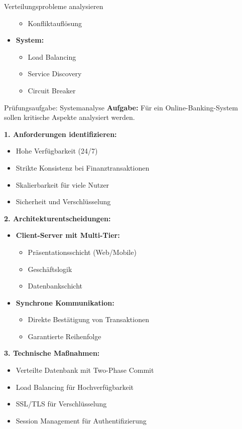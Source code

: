 \begin{KR}{Verteilungsprobleme analysieren}
\begin{minipage}[t]{0.5\textwidth}
\begin{itemize}
\begin{itemize}
                \item Konfliktauflösung
            \end{itemize}
            \item \textbf{System:}
            \begin{itemize}
                \item Load Balancing
                \item Service Discovery
                \item Circuit Breaker
            \end{itemize}
        \end{itemize}
    \end{minipage}
\end{KR}



\begin{example2}{Prüfungsaufgabe: Systemanalyse}
\textbf{Aufgabe:}
Für ein Online-Banking-System sollen kritische Aspekte analysiert werden.

\textbf{1. Anforderungen identifizieren:}
\begin{itemize}
    \item Hohe Verfügbarkeit (24/7)
    \item Strikte Konsistenz bei Finanztransaktionen
    \item Skalierbarkeit für viele Nutzer
    \item Sicherheit und Verschlüsselung
\end{itemize}

\textbf{2. Architekturentscheidungen:}
\begin{itemize}
    \item \textbf{Client-Server mit Multi-Tier:}
    \begin{itemize}
        \item Präsentationsschicht (Web/Mobile)
        \item Geschäftslogik
        \item Datenbankschicht
    \end{itemize}
    
    \item \textbf{Synchrone Kommunikation:}
    \begin{itemize}
        \item Direkte Bestätigung von Transaktionen
        \item Garantierte Reihenfolge
    \end{itemize}
\end{itemize}

\textbf{3. Technische Maßnahmen:}
\begin{itemize}
    \item Verteilte Datenbank mit Two-Phase Commit
    \item Load Balancing für Hochverfügbarkeit
    \item SSL/TLS für Verschlüsselung
    \item Session Management für Authentifizierung
\end{itemize}
\end{example2}

